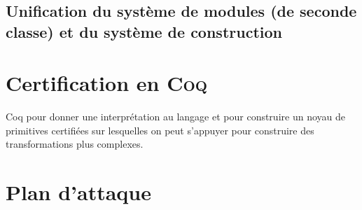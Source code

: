 \documentclass{article}
\begin{document}
\subsection{Unification du système de modules (de seconde classe) et du système de construction}

\section{Certification en \textsc{Coq}}

Coq pour donner une interprétation au langage et pour construire un noyau de primitives
certifiées sur lesquelles on peut s'appuyer pour construire des transformations plus 
complexes. 

\section{Plan d'attaque}
\end{document}
